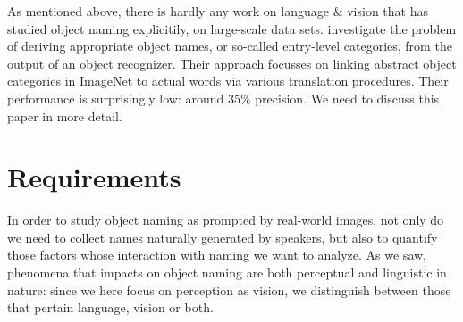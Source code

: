 As mentioned above, there is hardly any work on language \& vision that has studied object naming explicitily, on large-scale data sets. 
\cite{Ordonez:2016} investigate the problem of deriving appropriate object names, or so-called entry-level
 categories, from the output of an object recognizer. Their approach focusses on linking abstract object categories in ImageNet to actual words via various translation procedures. 
 Their performance is surprisingly low: around 35\% precision. We need to discuss this paper in more detail.
 
\section{Requirements}
In order to study object naming as prompted by real-world images, not only do we need to collect names naturally generated by speakers, but also to quantify those factors whose interaction with naming we want to analyze. As we saw, phenomena that impacts on object naming are both perceptual and linguistic in nature: since we here focus on perception as vision, we distinguish between those that pertain language, vision or both.

